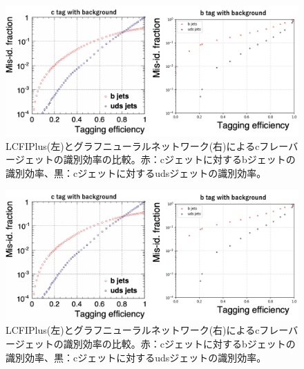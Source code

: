 \begin{figure}[H]
	\begin{center}
 \includegraphics[keepaspectratio, scale=0.3]
 	{Figure/Flavortagging/gnneff_c.png}
 		\caption{LCFIPlus(左)とグラフニューラルネットワーク(右)によるcフレーバージェットの識別効率の比較。赤：cジェットに対するbジェットの識別効率、黒：cジェットに対するudsジェットの識別効率。}
 		\label{gnneff_c}
	\end{center}
\end{figure}

\begin{figure}[H]
	\begin{center}
 \includegraphics[keepaspectratio, scale=0.3]
 	{Figure/Flavortagging/gnneff_c.png}
 		\caption{LCFIPlus(左)とグラフニューラルネットワーク(右)によるcフレーバージェットの識別効率の比較。赤：cジェットに対するbジェットの識別効率、黒：cジェットに対するudsジェットの識別効率。}
 		\label{gnneff_c}
	\end{center}
\end{figure}

